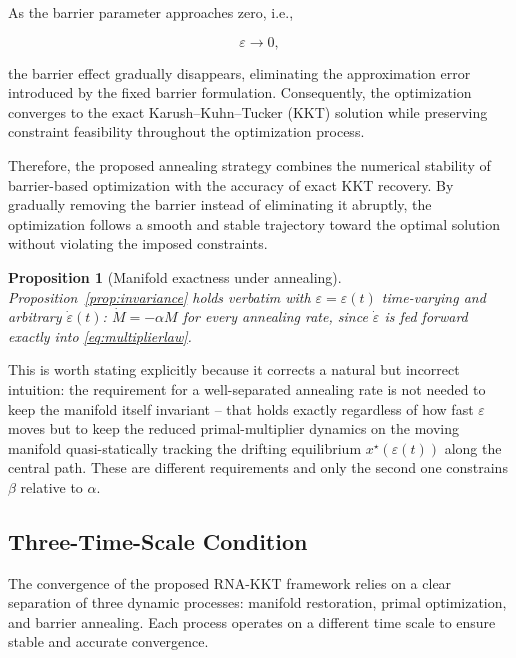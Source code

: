\documentclass[11pt,onecolumn]{article}
\newtheorem{proposition}[theorem]{Proposition}
\theoremstyle{definition}
\theoremstyle{remark}
\begin{document}
As the barrier parameter approaches zero, i.e.,

\begin{equation}
\varepsilon\rightarrow0,
\label{eq:epsilon_zero}
\end{equation}

the barrier effect gradually disappears, eliminating the approximation error introduced by the fixed barrier formulation. Consequently, the optimization converges to the exact Karush--Kuhn--Tucker (KKT) solution while preserving constraint feasibility throughout the optimization process.

Therefore, the proposed annealing strategy combines the numerical stability of barrier-based optimization with the accuracy of exact KKT recovery. By gradually removing the barrier instead of eliminating it abruptly, the optimization follows a smooth and stable trajectory toward the optimal solution without violating the imposed constraints.

\begin{proposition}[Manifold exactness under annealing] \label{prop:annealedexactness}
Proposition~\ref{prop:invariance} holds verbatim with $\varepsilon = \varepsilon(t)$
time-varying and arbitrary $\dot\varepsilon(t)$: $\dot M = -\alpha M$ for every annealing rate,
since $\dot\varepsilon$ is fed forward exactly into \eqref{eq:multiplierlaw}.
\end{proposition}

This is worth stating explicitly because it corrects a natural but incorrect intuition: the
requirement for a well-separated annealing rate is not needed to keep the manifold itself
invariant -- that holds exactly regardless of how fast $\varepsilon$ moves but to keep the
reduced primal-multiplier dynamics on the moving manifold quasi-statically tracking the
drifting equilibrium $x^\star(\varepsilon(t))$ along the central path. These are different
requirements and only the second one constrains $\beta$ relative to $\alpha$.


\subsection{Three-Time-Scale Condition}

The convergence of the proposed RNA-KKT framework relies on a clear separation of three dynamic processes: manifold restoration, primal optimization, and barrier annealing. Each process operates on a different time scale to ensure stable and accurate convergence.
\end{document}
